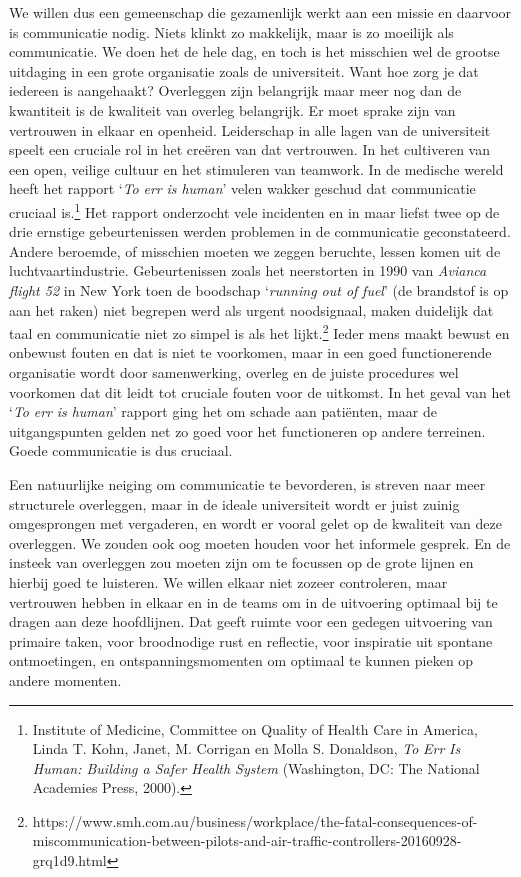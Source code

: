 \documentclass[smallauthor, chapterhaspagenum, nochapterinheader, pagenuminheader,  bigchapnum,medium2, tocpages,  garamond, titleinheader]{jote-book}
\begin{document}
	We willen dus een gemeenschap die gezamenlijk werkt aan een missie en daarvoor is communicatie nodig. Niets klinkt zo makkelijk, maar is zo moeilijk als communicatie. We doen het de hele dag, en toch is het misschien wel de grootse uitdaging in een grote organisatie zoals de universiteit. Want hoe zorg je dat iedereen is aangehaakt? Overleggen zijn belangrijk maar meer nog dan de kwantiteit is de kwaliteit van overleg belangrijk. Er moet sprake zijn van vertrouwen in elkaar en openheid. Leiderschap in alle lagen van de universiteit speelt een cruciale rol in het creëren van dat vertrouwen. In het cultiveren van een open, veilige cultuur en het stimuleren van teamwork. In de medische wereld heeft het rapport ‘\emph{To}\emph{ }\emph{err}\emph{ is human}' velen wakker geschud dat communicatie cruciaal is.\footnote{Institute of Medicine, Committee on Quality of Health Care in America, Linda T. Kohn, Janet, M. Corrigan en Molla S. Donaldson, \emph{To}\emph{ }\emph{Err}\emph{ Is Human: Building a Safer Health System}\emph{ }(Washington, DC: The National Academies Press, 2000).} Het rapport onderzocht vele incidenten en in maar liefst twee op de drie ernstige gebeurtenissen werden problemen in de communicatie geconstateerd. Andere beroemde, of misschien moeten we zeggen beruchte, lessen komen uit de luchtvaartindustrie. Gebeurtenissen zoals het neerstorten in 1990 van \emph{Avianca}\emph{ flight 52} in New York toen de boodschap ‘\emph{running out of }\emph{fuel}' (de brandstof is op aan het raken) niet begrepen werd als urgent noodsignaal, maken duidelijk dat taal en communicatie niet zo simpel is als het lijkt.\footnote{https://www.smh.com.au/business/workplace/the-fatal-consequences-of-miscommunication-between-pilots-and-air-traffic-controllers-20160928-grq1d9.html} Ieder mens maakt bewust en onbewust fouten en dat is niet te voorkomen, maar in een goed functionerende organisatie wordt door samenwerking, overleg en de juiste procedures wel voorkomen dat dit leidt tot cruciale fouten voor de uitkomst. In het geval van het ‘\emph{To}\emph{ }\emph{err}\emph{ is human}' rapport ging het om schade aan patiënten, maar de uitgangspunten gelden net zo goed voor het functioneren op andere terreinen. Goede communicatie is dus cruciaal.



	Een natuurlijke neiging om communicatie te bevorderen, is streven naar meer structurele overleggen, maar in de ideale universiteit wordt er juist zuinig omgesprongen met vergaderen, en wordt er vooral gelet op de kwaliteit van deze overleggen. We zouden ook oog moeten houden voor het informele gesprek. En de insteek van overleggen zou moeten zijn om te focussen op de grote lijnen en hierbij goed te luisteren. We willen elkaar niet zozeer controleren, maar vertrouwen hebben in elkaar en in de teams om in de uitvoering optimaal bij te dragen aan deze hoofdlijnen. Dat geeft ruimte voor een gedegen uitvoering van primaire taken, voor broodnodige rust en reflectie, voor inspiratie uit spontane ontmoetingen, en ontspanningsmomenten om optimaal te kunnen pieken op andere momenten.
\end{document}

